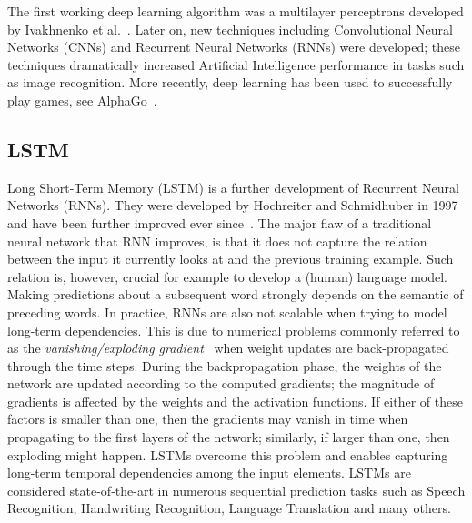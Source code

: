 The first working deep learning algorithm was a multilayer perceptrons developed by Ivakhnenko et al.~\cite{ivakhnenko1973cybernetic}. Later on, new techniques including Convolutional Neural Networks (CNNs) and Recurrent Neural Networks (RNNs) were developed; these techniques dramatically increased Artificial Intelligence performance in tasks such as image recognition. More recently, deep learning has been used to successfully play games, see AlphaGo~\cite{alphago}.

\subsection{LSTM}
Long Short-Term Memory (LSTM) is a further development of Recurrent Neural Networks (RNNs). They were developed by Hochreiter and Schmidhuber in 1997 and have been further improved ever since~\cite{Greff2016}. The major flaw of a traditional neural network that RNN improves, is that it does not capture the relation between the input it currently looks at and the previous training example. Such relation is, however, crucial for example to develop a (human) language model. Making predictions about a subsequent word strongly depends on the semantic of preceding words. In practice, RNNs are also not scalable when trying to model long-term dependencies. 
This is due to numerical problems commonly referred to as the \textit{vanishing/exploding gradient}~\cite{bengio1994learning} when weight updates are back-propagated through the time steps. During the backpropagation	phase, the weights of the network are updated according to the computed gradients; the magnitude of gradients is affected by the weights and the activation functions.
If either of these factors is smaller than one, then the gradients may vanish in time when propagating to the first layers of the network; similarly, if larger than one, then exploding might happen. LSTMs overcome this problem and enables capturing long-term temporal dependencies among the input elements. LSTMs are considered state-of-the-art in numerous sequential prediction tasks such as Speech Recognition, Handwriting Recognition, Language Translation and many others.

